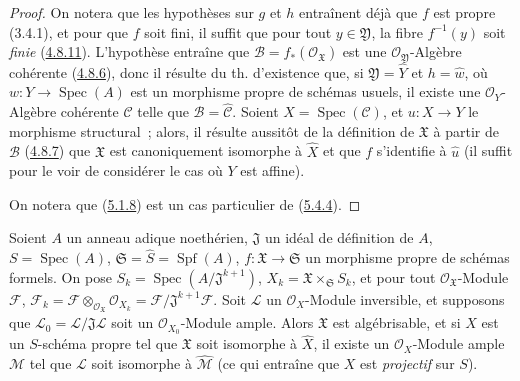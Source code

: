 \begin{proof}
On notera que les hypothèses sur $g$ et $h$ entraînent déjà que $f$ est propre
(3.4.1), et pour que $f$ soit fini, il suffit que pour tout $y\in\mathfrak Y$, la
fibre $f^{-1}(y)$ soit \emph{finie} (\hyperref[III.4.8.11-fr]{4.8.11}). L'hypothèse
entraîne que $\mathcal B=f_*(\mathcal O_{\mathfrak X})$ est une
$\mathcal O_{\mathfrak Y}$-Algèbre cohérente
(\hyperref[III.4.8.6-fr]{4.8.6}), donc il résulte du th. d'existence que, si
$\mathfrak Y=\widehat Y$ et $h=\widehat w$, où
$w:Y\to\operatorname{Spec}(A)$ est un morphisme propre de schémas usuels, il
existe une $\mathcal O_Y$-Algèbre cohérente $\mathcal C$ telle que
$\mathcal B=\widehat{\mathcal C}$. Soient $X=\operatorname{Spec}(\mathcal C)$, et
$u:X\to Y$ le morphisme structural~; alors, il résulte aussitôt de la définition de
$\mathfrak X$ à partir de $\mathcal B$
(\hyperref[III.4.8.7-fr]{4.8.7}) que $\mathfrak X$ est canoniquement isomorphe à
$\widehat X$ et que $f$ s'identifie à $\widehat u$ (il suffit pour le voir de
considérer le cas où $Y$ est affine).

On notera que (\hyperref[III.5.1.8-fr]{5.1.8}) est un cas particulier de
(\hyperref[III.5.4.4-fr]{5.4.4}).
\end{proof}

\begin{theorem}[5.4.5]
\label{III.5.4.5-fr}
Soient $A$ un anneau adique noethérien, $\mathfrak J$ un idéal de définition de
$A$, $S=\operatorname{Spec}(A)$,
$\mathfrak S=\widehat S=\operatorname{Spf}(A)$,
$f:\mathfrak X\to\mathfrak S$ un morphisme propre de schémas formels. On pose
$S_k=\operatorname{Spec}(A/\mathfrak J^{k+1})$,
$X_k=\mathfrak X\times_{\mathfrak S}S_k$, et pour tout
$\mathcal O_{\mathfrak X}$-Module $\mathcal F$,
$\mathcal F_k=\mathcal F\otimes_{\mathcal O_{\mathfrak X}}\mathcal O_{X_k}
=\mathcal F/\mathfrak J^{k+1}\mathcal F$.
Soit $\mathcal L$ un $\mathcal O_X$-Module inversible, et supposons
que $\mathcal L_0=\mathcal L/\mathfrak J\mathcal L$ soit un
$\mathcal O_{X_0}$-Module ample. Alors $\mathfrak X$ est algébrisable, et si
$X$ est un $S$-schéma propre tel que $\mathfrak X$ soit isomorphe à
$\widehat X$, il existe un $\mathcal O_X$-Module ample $\mathcal M$ tel que
$\mathcal L$ soit isomorphe à $\widehat{\mathcal M}$ \textup{(ce qui entraîne que
$X$ est \emph{projectif} sur $S$)}.
\end{theorem}

